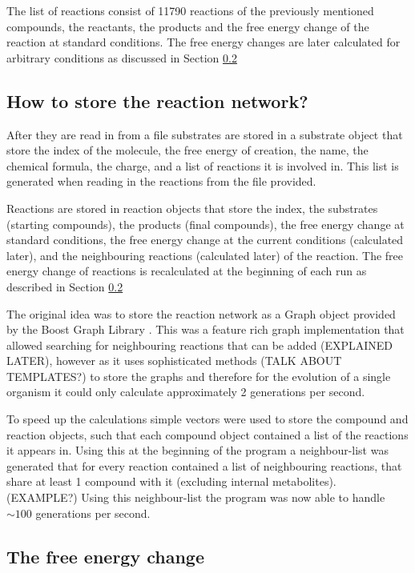 \documentclass[10pt,a4paper]{article}
\begin{document}
	The list of reactions consist of 11790 reactions of the previously mentioned compounds, the reactants, the products and the free energy change of the reaction at standard conditions. The free energy changes are later calculated for arbitrary conditions as discussed in Section \ref{chap:freechange}
	
	
	\subsection{How to store the reaction network?}\label{chap:howtostore}
	
	After they are read in from a file substrates are stored in a substrate object that store the index of the molecule, the free energy of creation, the name, the chemical formula, the charge, and a list of reactions it is involved in. This list is generated when reading in the reactions from the file provided.
	
	Reactions are stored in reaction objects that store the index, the substrates  (starting compounds), the products  (final compounds), the free energy change at standard conditions, the free energy change at the current conditions (calculated later), and the neighbouring reactions (calculated later) of the reaction. The free energy change of reactions is recalculated at the beginning of each run as described in Section \ref{chap:freechange}
	
	The original idea was to store the reaction network as a Graph object provided by the Boost Graph Library \cite{boostlibraries}. This was a feature rich graph implementation that allowed searching for neighbouring reactions that can be added (EXPLAINED LATER), however as it uses sophisticated methods (TALK ABOUT TEMPLATES?) to store the  graphs and therefore for the evolution of a single organism it could only calculate approximately 2 generations per second. 
	
	To speed up the calculations simple vectors were used to store the compound and reaction objects, such that each compound object contained a list of the reactions it appears in. Using this at the beginning of the program a neighbour-list was generated that for every reaction contained a list of neighbouring reactions, that share at least 1 compound with it (excluding internal metabolites). (EXAMPLE?) Using this neighbour-list the program was now able to handle $\sim 100$ generations per second. 
	
	\subsection{The free energy change}\label{chap:freechange}
	
\end{document}
